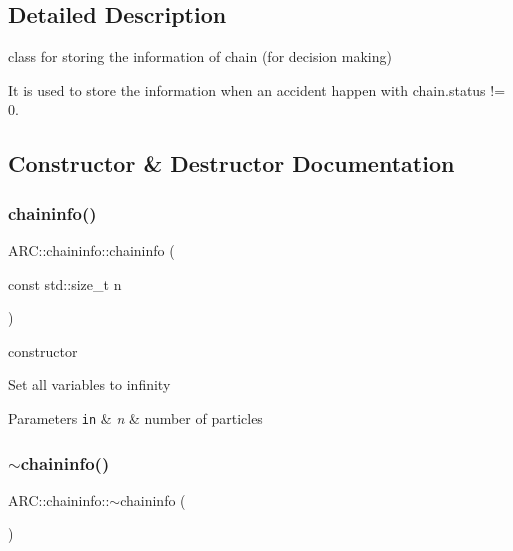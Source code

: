 \subsection{Detailed Description}
class for storing the information of chain (for decision making) 

It is used to store the information when an accident happen with chain.\+status != 0. 

\subsection{Constructor \& Destructor Documentation}
\hypertarget{classARC_1_1chaininfo_a9e67e1e081f3a09d8c8bec3b55d108d1}{}\label{classARC_1_1chaininfo_a9e67e1e081f3a09d8c8bec3b55d108d1} 
\subsubsection{\texorpdfstring{chaininfo()}{chaininfo()}}
{\footnotesize\ttfamily A\+R\+C\+::chaininfo\+::chaininfo (\begin{DoxyParamCaption}\item[{const std\+::size\+\_\+t}]{n }\end{DoxyParamCaption})\hspace{0.3cm}{\ttfamily [inline]}}



constructor 

Set all variables to infinity 
\begin{DoxyParams}[1]{Parameters}
\mbox{\tt in}  & {\em n} & number of particles \\
\hline
\end{DoxyParams}
\hypertarget{classARC_1_1chaininfo_aca51a64943e31e1ac33473fb90c39a17}{}\label{classARC_1_1chaininfo_aca51a64943e31e1ac33473fb90c39a17} 
\subsubsection{\texorpdfstring{$\sim$chaininfo()}{~chaininfo()}}
{\footnotesize\ttfamily A\+R\+C\+::chaininfo\+::$\sim$chaininfo (\begin{DoxyParamCaption}{ }\end{DoxyParamCaption})\hspace{0.3cm}{\ttfamily [inline]}}



